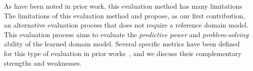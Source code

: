 \documentclass[letterpaper]{article} %
\begin{document}
As have been noted in prior work, this evaluation method has many limitations~\cite{garrido2024challenges,Oswald2024DLLMDomainModeling,aineto2024action,mordoch2024safe}
The limitations of this evaluation method  and propose, as our first contribution, an alternative evaluation process that does not require a reference domain model. 
This evaluation process aims to evaluate the \emph{predictive power} and \emph{problem-solving} ability of the learned domain model. 
Several specific metrics have been defined for this type of evaluation in prior works~\citep{garrido2024challenges,aineto2019learning,juba2021safe,mordoch2024safe,Oswald2024DLLMDomainModeling}, and we discuss their complementary strengths and weaknesses. 
\end{document}
